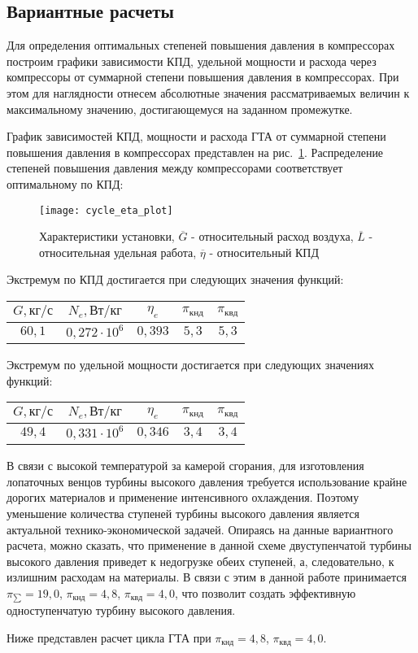 \subsection{Вариантные расчеты}
Для определения оптимальных степеней повышения давления в компрессорах
построим графики зависимости КПД, удельной мощности и расхода через компрессоры от суммарной степени повышения давления в компрессорах.
При этом для наглядности отнесем абсолютные значения рассматриваемых величин к максимальному значению,
достигающемуся на заданном промежутке.

График зависимостей КПД,
мощности и расхода ГТА от суммарной степени повышения давления в компрессорах представлен на рис.~\ref{img:cycle_eta_plot}.
Распределение степеней повышения давления между компрессорами соответствует оптимальному по КПД:
\begin{figure}[H]
    \centering
	\texttt{[image: cycle\_eta\_plot]}
	\caption{
		Характеристики установки,
		$\overline{G}$ - относительный расход воздуха,
		$\overline{L}$ - относительная удельная работа,
		$\overline{\eta}$ - относительный КПД
	}
	\label{img:cycle_eta_plot}
\end{figure}

Экстремум по КПД достигается при следующих значения функций:
\begin{center}
	\begin{tabular}{|c|c|c|c|c|}
	\hline
		$G, кг/с$ & $N_e, Вт/кг$ & $\eta_e$ & $\pi_{кнд}$ & $\pi_{квд}$ \\ \hline
		$60,1$ &
		$0,272 \cdot 10^6$ &
		$0,393$ &
		$5,3$ &
		$5,3$ \\ \hline
	\end{tabular}
\end{center}

Экстремум по удельной мощности достигается при следующих значениях функций:
\begin{center}
	\begin{tabular}{|c|c|c|c|c|}
	\hline
		$G, кг/с$ & $N_e, Вт/кг$ & $\eta_e$ & $\pi_{кнд}$ & $\pi_{квд}$ \\ \hline
		$49,4$ &
		$0,331 \cdot 10^6$ &
		$0,346$ &
		$3,4$ &
		$3,4$ \\ \hline
	\end{tabular}
\end{center}

В связи с высокой температурой за камерой сгорания, для изготовления лопаточных венцов турбины высокого давления требуется
использование крайне дорогих материалов и применение интенсивного охлаждения. Поэтому уменьшение количества ступеней
турбины высокого давления является актуальной технико-экономической задачей. Опираясь на данные вариантного расчета,
можно сказать, что применение в данной схеме двуступенчатой турбины высокого давления приведет к недогрузке
обеих ступеней, а, следовательно, к излишним расходам на материалы. В связи с этим в данной работе принимается
$\pi_{\sum} = 19,0$, $\pi_{кнд} = 4,8$, $\pi_{квд} = 4,0$,
что позволит создать эффективную одноступенчатую турбину высокого давления.

Ниже представлен расчет цикла ГТА при $\pi_{кнд} = 4,8$, $\pi_{квд} = 4,0$.
